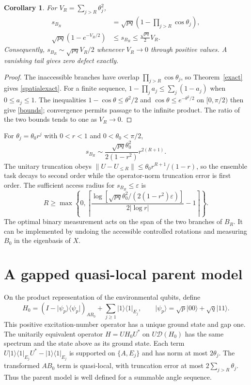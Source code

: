 \documentclass[11pt,a4paper]{article}
\newtheorem{corollary}[theorem]{Corollary}
\theoremstyle{definition}
\theoremstyle{plain}
\newenvironment{statementframe}{%
  \par\addvspace{0.55\baselineskip}\noindent
  \begingroup\setlength{\fboxrule}{0.3pt}\setlength{\fboxsep}{7pt}%
  \begin{lrbox}{\statementbox}%
  \begin{minipage}{\dimexpr\linewidth-2\fboxsep-2\fboxrule\relax}%
}{%
  \end{minipage}\end{lrbox}%
  {\color{black!45}\fbox{\color{black}\usebox{\statementbox}}}%
  \endgroup\par\addvspace{0.45\baselineskip}%
}
\newcommand{\ket}[1]{\lvert#1\rangle}
\newcommand{\bra}[1]{\langle#1\rvert}
\newcommand{\norm}[1]{\left\lVert#1\right\rVert}
\begin{document}
\begin{statementframe}
\begin{corollary}\label{spatial}
For $V_R=\sum_{j>R}\theta_j^2$,
\begin{align}
s_{B_R}&=\sqrt{pq}\left(1-\prod_{j>R}\cos\theta_j\right),
\label{spatialexact}\\
\sqrt{pq}(1-e^{-V_R/2})&\leq s_{B_R}\leq\frac{\sqrt{pq}}2V_R.
\label{bounds}
\end{align}
Consequently, $s_{B_R}\sim\sqrt{pq}V_R/2$ whenever $V_R\to0$ through
positive values. A vanishing tail gives zero defect exactly.
\end{corollary}
\end{statementframe}
\begin{proof}
The inaccessible branches have overlap $\prod_{j>R}\cos\theta_j$, so
Theorem~\ref{exact} gives \eqref{spatialexact}. For a finite sequence,
$1-\prod_j a_j\leq\sum_j(1-a_j)$ when $0\leq a_j\leq1$. The inequalities
$1-\cos\theta\leq\theta^2/2$ and
$\cos\theta\leq e^{-\theta^2/2}$ on $[0,\pi/2)$ then give
\eqref{bounds}; convergence permits passage to the infinite product. The
ratio of the two bounds tends to one as $V_R\to0$.
\end{proof}

For $\theta_j=\theta_0r^j$ with $0<r<1$ and $0<\theta_0<\pi/2$,
\begin{equation}\label{rate}
s_{B_R}\sim\frac{\sqrt{pq}\theta_0^2}{2(1-r^2)}r^{2(R+1)}.
\end{equation}
The unitary truncation obeys
$\norm{U-U_{\leq R}}\leq\theta_0r^{R+1}/(1-r)$, so the ensemble task
decays to second order while the operator-norm truncation error is first
order. The sufficient access radius for $s_{B_R}\leq\varepsilon$ is
\[
R\geq\max\left\{0,\left\lceil
\frac{\log[\sqrt{pq}\theta_0^2/(2(1-r^2)\varepsilon)]}
{2|\log r|}-1\right\rceil\right\}.
\]
The optimal binary measurement acts on the span of the two branches of
$B_R$. It can be implemented by undoing the accessible controlled rotations
and measuring $B_0$ in the eigenbasis of $X$.

\clearpage
\section{A gapped quasi-local parent model}
On the product representation of the environmental qubits, define
\[
H_0=(I-\ket{\psi_p}\bra{\psi_p})_{AB_0}
+\sum_{j\geq1}\ket1\bra1_{E_j},
\qquad \ket{\psi_p}=\sqrt p\ket{00}+\sqrt q\ket{11}.
\]
This positive excitation-number operator has a unique ground state and gap
one. The unitarily equivalent operator $H=UH_0U^*$ on $U\mathcal D(H_0)$
has the same spectrum and the state above as its ground state. Each term
$U\ket1\bra1_{E_j}U^*-\ket1\bra1_{E_j}$ is supported on $\{A,E_j\}$ and
has norm at most $2\theta_j$. The transformed $AB_0$ term is quasi-local,
with truncation error at most $2\sum_{j>R}\theta_j$. Thus the parent model is
well defined for a summable angle sequence.
\end{document}

